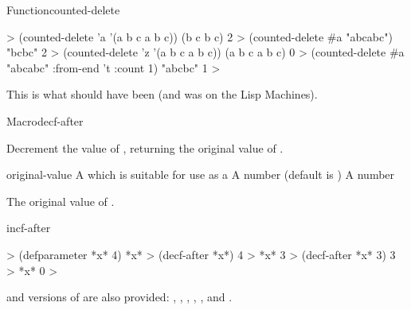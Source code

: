\documentclass[10pt,twoside,english,pdftex]{article}
\begin{document}
\begin{functiondoc}{Function}{counted-delete}{
    }
\fnexamples
\begin{example}
%
\W\supp
  > (counted-delete 'a '(a b c a b c))
  (b c b c)
  2
  > (counted-delete #\bkslash{}a "abcabc")
  "bcbc"
  2\goodpagebreak
  > (counted-delete 'z '(a b c a b c))
  (a b c a b c)
  0
  > (counted-delete #\bkslash{}a "abcabc" :from-end 't :count 1)
  "abcbc"
  1
  >
\end{example}

\fnnote This is what  should have been (and was on the
Lisp Machines).

\end{functiondoc}


\begin{functiondoc}{Macro}{decf-after}{
    }
%

\fnsyntax

\fnpurpose Decrement the value of , returning the original value of
.

\fnpackage {}

\fnmodule {}

\fnargs
\begin{args}{original-value}
\arg[place] A  which is suitable for use as a 
\arg[decrement] A number (default is )
 A number
\end{args}

\fnreturns The original value of .

\begin{alsos}{incf-after}
\end{alsos}

\fnexamples
\begin{example}
%
\W\supp
  > (defparameter *x* 4)
  *x*
  > (decf-after *x*)
  4 
  > *x*
  3
  > (decf-after *x* 3)
  3
  > *x*
  0
  >
\end{example}

\fnnote
%
%
%
%
%
%
%
%
 and  versions of  are also
provided: , ,
, ,
, and .

\end{functiondoc}
\end{document}
